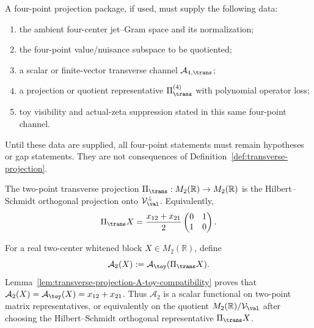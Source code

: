\begin{wip}
\label{gap:four-point-projection-data}
A four-point projection package, if used, must supply the following data:
\begin{enumerate}[label=\textup{(F\arabic*)},leftmargin=*]
\item the ambient four-center jet--Gram space and its normalization;
\item the four-point value/nuisance subspace to be quotiented;
\item a scalar or finite-vector transverse channel
      \(\mathcal A_{4,\trans}\);
\item a projection or quotient representative \(\Pi_\trans^{(4)}\) with
      polynomial operator loss;
\item toy visibility and actual-zeta suppression stated in this same
      four-point channel.
\end{enumerate}
Until these data are supplied, all four-point statements must remain
hypotheses or gap statements.  They are not consequences of
Definition~\ref{def:transverse-projection}.
\end{wip}

\begin{definition}
\label{def:transverse-projection}
The two-point transverse projection
\(\Pi_\trans:M_2(\mathbb R)\to M_2(\mathbb R)\) is the Hilbert--Schmidt
orthogonal projection onto \(\mathcal V_\val^\perp\).  Equivalently,
\begin{equation}
\label{eq:Pi-trans-explicit}
        \Pi_\trans X
        =\frac{x_{12}+x_{21}}{2}
        \begin{pmatrix}0&1\\1&0\end{pmatrix}.
\end{equation}
\end{definition}

\begin{definition}
\label{def:two-point-scalar-transverse-channel}
For a real two-center whitened block \(X\in M_2(\mathbb R)\), define
\begin{equation}
\label{eq:two-point-scalar-channel}
        \mathcal A_2(X):=\mathcal A_\toy(\Pi_\trans X).
\end{equation}
Lemma~\ref{lem:transverse-projection-A-toy-compatibility} proves that
\(\mathcal A_2(X)=\mathcal A_\toy(X)=x_{12}+x_{21}\).  Thus
\(\mathcal A_2\) is a scalar functional on two-point matrix
representatives, or equivalently on the quotient
\(M_2(\mathbb R)/\mathcal V_\val\) after choosing the Hilbert--Schmidt
orthogonal representative \(\Pi_\trans X\).
\end{definition}

